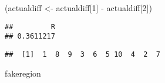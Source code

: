 \documentclass[
]{article}
\newenvironment{Shaded}{\begin{snugshade}}{\end{snugshade}}
\newcommand{\CommentTok}[1]{\textcolor[rgb]{0.56,0.35,0.01}{\textit{#1}}}
\newcommand{\DecValTok}[1]{\textcolor[rgb]{0.00,0.00,0.81}{#1}}
\newcommand{\FunctionTok}[1]{\textcolor[rgb]{0.00,0.00,0.00}{#1}}
\newcommand{\NormalTok}[1]{#1}
\newcommand{\OtherTok}[1]{\textcolor[rgb]{0.56,0.35,0.01}{#1}}
\newcommand{\SpecialCharTok}[1]{\textcolor[rgb]{0.00,0.00,0.00}{#1}}
\begin{document}
\begin{Shaded}
\begin{Highlighting}[]
\NormalTok{(actualdiff }\OtherTok{\textless{}{-}}\NormalTok{ actualdiff[}\DecValTok{1}\NormalTok{] }\SpecialCharTok{{-}}\NormalTok{ actualdiff[}\DecValTok{2}\NormalTok{])}
\end{Highlighting}
\end{Shaded}

\begin{verbatim}
##         R 
## 0.3611217
\end{verbatim}

\begin{Shaded}
\end{Shaded}

\begin{verbatim}
##  [1]  1  8  9  3  6  5 10  4  2  7
\end{verbatim}

\begin{Shaded}
\begin{Highlighting}[]
\NormalTok{fakeregion}
\end{Highlighting}
\end{Shaded}
\end{document}
